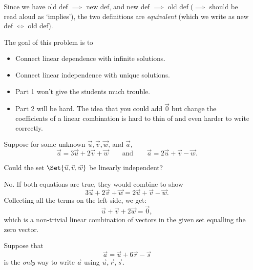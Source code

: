 \documentclass{problemset}
\begin{document}
	Since we have old def $\implies$ new def, and new def $\implies$ old def
	($\implies$ should be read aloud as `implies'), the two definitions
	are \emph{equivalent} (which we write as new def $\iff$ old def).


	\question
	\begin{annotation}
		\begin{goals}

			The goal of this problem is to
			\begin{itemize}
				\item Connect linear dependence with infinite solutions.
				\item Connect linear independence with unique solutions.
			\end{itemize}
		\end{goals}

		\begin{notes}
			\begin{itemize}
				\item Part 1 won't give the students much trouble.
				\item Part 2 will be hard. The idea that you could add $\vec 0$
					but change the coefficients of a linear combination
					is hard to thin of and even harder to write correctly.
			\end{itemize}
		\end{notes}
	\end{annotation}
	Suppose for some unknown $\vec u, \vec v, \vec w$, and $\vec a$,
	\[
		\vec a = 3\vec u+2\vec v +\vec w\qquad \text{and}\qquad
		\vec a = 2\vec u+\vec v -\vec w.
	\]
	\begin{parts}
		\item Could the set $\Set{\vec u,\vec v,\vec w}$ be linearly
		independent?
			\begin{solution}
				No. If both equations are true, they would combine to show
				\[
					3\vec u+2\vec v +\vec w = 2\vec u+\vec v -\vec w.
				\]
				Collecting all the terms on the left side, we get:
				\[
					\vec u + \vec v + 2\vec w = \vec 0,
				\]
				which is a non-trivial linear combination of vectors in the given
				set equalling the zero vector.
			\end{solution}
	\end{parts}
	Suppose that
	\[
		\vec a = \vec u+6\vec r-\vec s
	\]
	is the \emph{only} way to write $\vec a$ using $\vec u,\vec r,\vec s$.
\end{document}
